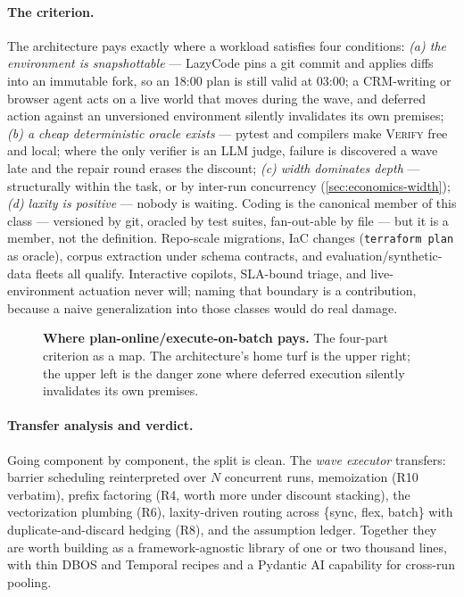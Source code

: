\documentclass[11pt]{article}
\begin{document}
\paragraph{The criterion.} The architecture pays exactly where a workload satisfies four conditions:
\emph{(a) the environment is snapshottable} --- LazyCode pins a git commit and applies diffs into an immutable fork, so an 18:00 plan is still valid at 03:00; a CRM-writing or browser agent acts on a live world that moves during the wave, and deferred action against an unversioned environment silently invalidates its own premises;
\emph{(b) a cheap deterministic oracle exists} --- pytest and compilers make \textsc{Verify} free and local; where the only verifier is an LLM judge, failure is discovered a wave late and the repair round erases the discount;
\emph{(c) width dominates depth} --- structurally within the task, or by inter-run concurrency (\cref{sec:economics-width});
\emph{(d) laxity is positive} --- nobody is waiting.
Coding is the canonical member of this class --- versioned by git, oracled by test suites, fan-out-able by file --- but it is a member, not the definition. Repo-scale migrations, IaC changes (\texttt{terraform plan} as oracle), corpus extraction under schema contracts, and evaluation/synthetic-data fleets all qualify. Interactive copilots, SLA-bound triage, and live-environment actuation never will; naming that boundary is a contribution, because a naive generalization into those classes would do real damage.

\begin{figure}[!htbp]
\centering

\caption{\textbf{Where plan-online/execute-on-batch pays.} The four-part criterion as a map. The architecture's home turf is the upper right; the upper left is the danger zone where deferred execution silently invalidates its own premises.}
\label{fig:quadrant}
\end{figure}

\paragraph{Transfer analysis and verdict.} Going component by component, the split is clean. The \emph{wave executor} transfers: barrier scheduling reinterpreted over $N$ concurrent runs, memoization (R10 verbatim), prefix factoring (R4, worth more under discount stacking), the vectorization plumbing (R6), laxity-driven routing across \{sync, flex, batch\} with duplicate-and-discard hedging (R8), and the assumption ledger. Together they are worth building as a framework-agnostic library of one or two thousand lines, with thin DBOS and Temporal recipes and a Pydantic AI capability for cross-run pooling.
\end{document}
